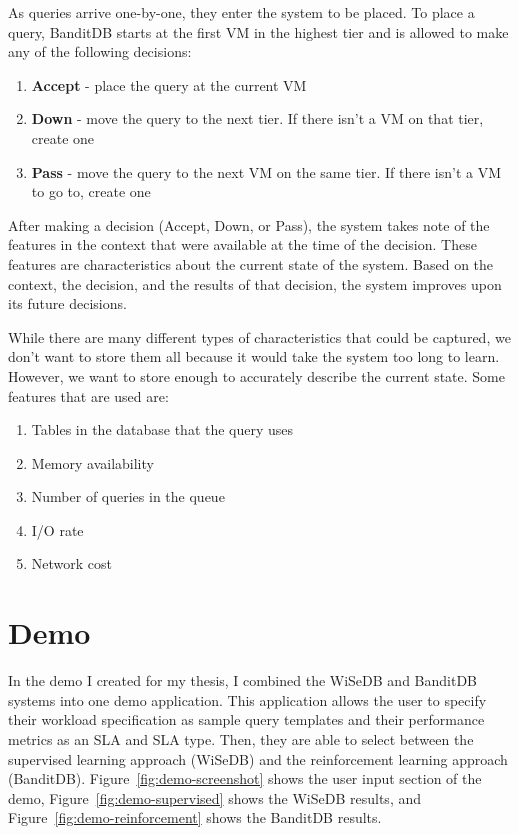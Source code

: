 \documentclass{brandiss}
\numberwithin{section}{chapter}
\numberwithin{figure}{chapter}
\theoremstyle{definition}
\theoremstyle{plain}
\theoremstyle{remark}
\begin{document}
As queries arrive one-by-one, they enter the system to be placed. To place a query, BanditDB starts at the first VM in the highest tier and is allowed to make any of the following decisions:

\begin{enumerate}
\item \textbf{Accept} - place the query at the current VM
\item \textbf{Down} - move the query to the next tier. If there isn't a VM on that tier, create one
\item \textbf{Pass} - move the query to the next VM on the same tier. If there isn't a VM to go to, create one
\end{enumerate}

After making a decision (Accept, Down, or Pass), the system takes note of the features in the context that were available at the time of the decision. These features are characteristics about the current state of the system. Based on the context, the decision, and the results of that decision, the system improves upon its future decisions.

While there are many different types of characteristics that could be captured, we don't want to store them all because it would take the system too long to learn. However, we want to store enough to accurately describe the current state. Some features that are used are:

\begin{enumerate}
\item Tables in the database that the query uses
\item Memory availability
\item Number of queries in the queue
\item I/O rate
\item Network cost
\end{enumerate}

\chapter{Demo}

In the demo \cite{demo} I created for my thesis, I combined the WiSeDB and BanditDB systems into one demo application. This application allows the user to specify their workload specification as sample query templates and their performance metrics as an SLA and SLA type. Then, they are able to select between the supervised learning approach (WiSeDB) and the reinforcement learning approach (BanditDB). Figure~\ref{fig:demo-screenshot} shows the user input section of the demo, Figure~\ref{fig:demo-supervised} shows the WiSeDB results, and Figure~\ref{fig:demo-reinforcement} shows the BanditDB results.
\end{document}
